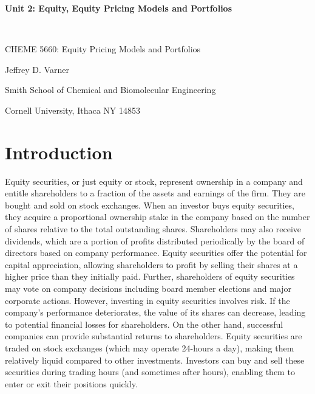 \documentclass[11pt]{article}
\theoremstyle{definition}
\begin{document}
{\par\centering\textbf{\Large Unit 2: Equity, Equity Pricing Models and Portfolios}}\\
{\par \centering \large{CHEME 5660: Equity Pricing Models and Portfolios}}
\vspace{0.2in}
{\par \centering \large{Jeffrey D. Varner}}
\vspace{0.05in}
{\par \centering \large{Smith School of Chemical and Biomolecular Engineering}}
{\par \centering \large{Cornell University, Ithaca NY 14853}}

\date{}
\thispagestyle{empty}

\setcounter{page}{1}

\tableofcontents
\clearpage
\listoffigures
\clearpage
\listofalgorithms
\clearpage

\section{Introduction}
Equity securities, or just equity or stock, represent ownership in a company and entitle shareholders to a fraction of the assets and earnings of the firm. 
They are bought and sold on stock exchanges. When an investor buys equity securities, they acquire a proportional ownership stake in the company based on the number of shares relative to the total outstanding shares.
Shareholders may also receive dividends, which are a portion of profits distributed periodically by the board of directors based on company performance.
Equity securities offer the potential for capital appreciation, allowing shareholders to profit by selling their shares at a higher price than they initially paid.
Further, shareholders of equity securities may vote on company decisions including board member elections and major corporate actions.
However, investing in equity securities involves risk. If the company's performance deteriorates, the value of its shares can decrease, leading to potential financial losses for shareholders. 
On the other hand, successful companies can provide substantial returns to shareholders.
Equity securities are traded on stock exchanges (which may operate 24-hours a day), making them relatively liquid compared to other investments. 
Investors can buy and sell these securities during trading hours (and sometimes after hours), enabling them to enter or exit their positions quickly.
\end{document}
